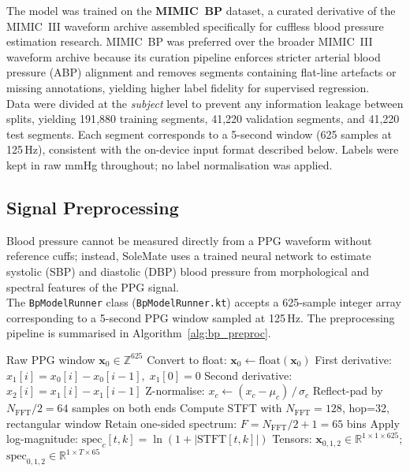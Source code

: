 \noindent The model was trained on the \textbf{MIMIC~BP} dataset, a curated derivative of the MIMIC~III
waveform archive assembled specifically for cuffless blood pressure estimation research.
MIMIC~BP was preferred over the broader MIMIC~III waveform archive because its curation pipeline
enforces stricter arterial blood pressure (ABP) alignment and removes segments containing
flat-line artefacts or missing annotations, yielding higher label fidelity for supervised
regression. \\

\noindent Data were divided at the \emph{subject} level to prevent any information leakage between splits,
yielding 191{,}880 training segments, 41{,}220 validation segments, and 41{,}220 test segments.
Each segment corresponds to a 5-second window (625 samples at 125\,Hz), consistent with the
on-device input format described below.
Labels were kept in raw mmHg throughout; no label normalisation was applied.


\subsection{Signal Preprocessing}
\label{subsubsec:bp_preproc}

\noindent Blood pressure cannot be measured directly from a PPG waveform without reference cuffs; instead,
SoleMate uses a trained neural network to estimate systolic (SBP) and diastolic (DBP) blood
pressure from morphological and spectral features of the PPG signal. \\

\noindent The \texttt{BpModelRunner} class (\texttt{BpModelRunner.kt}) accepts a 625-sample integer array
corresponding to a 5-second PPG window sampled at 125\,Hz.
The preprocessing pipeline is summarised in Algorithm~\ref{alg:bp_preproc}.

\begin{algorithm}[htbp]
\caption{PPG Signal Preprocessing for BP Estimation}
\label{alg:bp_preproc}
\begin{algorithmic}[1]
  \REQUIRE Raw PPG window $\mathbf{x}_0 \in \mathbb{Z}^{625}$
  \STATE Convert to float: $\mathbf{x}_0 \leftarrow \text{float}(\mathbf{x}_0)$
  \STATE First derivative: $x_1[i] = x_0[i] - x_0[i-1],\; x_1[0] = 0$
  \STATE Second derivative: $x_2[i] = x_1[i] - x_1[i-1]$
    \STATE Z-normalise: $x_c \leftarrow (x_c - \mu_c)\,/\,\sigma_c$
    \STATE Reflect-pad by $N_\text{FFT}/2 = 64$ samples on both ends
    \STATE Compute STFT with $N_\text{FFT}=128$, hop=32, rectangular window
    \STATE Retain one-sided spectrum: $F = N_\text{FFT}/2 + 1 = 65$ bins
    \STATE Apply log-magnitude: $\text{spec}_c[t,k] = \ln(1 + |\text{STFT}[t,k]|)$
  \ENDFOR
  \ENSURE Tensors: $\mathbf{x}_{0,1,2} \in \mathbb{R}^{1 \times 1 \times 625}$;
          $\text{spec}_{0,1,2} \in \mathbb{R}^{1 \times T \times 65}$
\end{algorithmic}
\end{algorithm}


